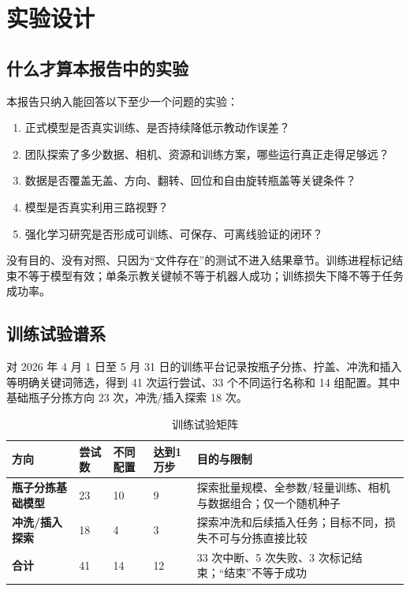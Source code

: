 \chapter{实验设计}

\section{什么才算本报告中的实验}

本报告只纳入能回答以下至少一个问题的实验：

\begin{enumerate}
  \item 正式模型是否真实训练、是否持续降低示教动作误差？
  \item 团队探索了多少数据、相机、资源和训练方案，哪些运行真正走得足够远？
  \item 数据是否覆盖无盖、方向、翻转、回位和自由旋转瓶盖等关键条件？
  \item 模型是否真实利用三路视野？
  \item 强化学习研究是否形成可训练、可保存、可离线验证的闭环？
\end{enumerate}

没有目的、没有对照、只因为“文件存在”的测试不进入结果章节。训练进程标记结束不等于模型有效；单条示教关键帧不等于机器人成功；训练损失下降不等于任务成功率。

\section{训练试验谱系}

对 2026 年 4 月 1 日至 5 月 31 日的训练平台记录按瓶子分拣、拧盖、冲洗和插入等明确关键词筛选，得到 41 次运行尝试、33 个不同运行名称和 14 组配置。其中基础瓶子分拣方向 23 次，冲洗/插入探索 18 次。


\begin{table}[H]
\centering
\caption{训练试验矩阵}
\begin{tabularx}{\textwidth}{>{\bfseries}p{34mm}p{23mm}p{29mm}p{28mm}X}
\toprule
方向 & 尝试数 & 不同配置 & 达到1万步 & 目的与限制\\
\midrule
瓶子分拣基础模型 & 23 & 10 & 9 & 探索批量规模、全参数/轻量训练、相机与数据组合；仅一个随机种子\\
冲洗/插入探索 & 18 & 4 & 3 & 探索冲洗和后续插入任务；目标不同，损失不可与分拣直接比较\\
合计 & 41 & 14 & 12 & 33 次中断、5 次失败、3 次标记结束；“结束”不等于成功\\
\bottomrule
\end{tabularx}
\end{table}

